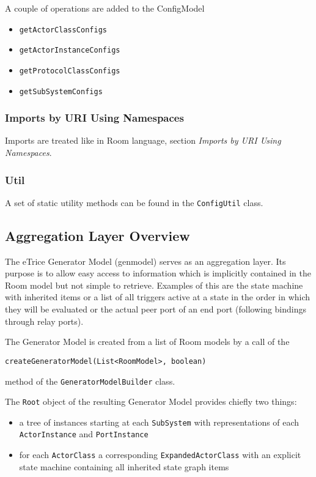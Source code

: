 A couple of operations are added to the ConfigModel
\begin{itemize}
\item \texttt{getActorClassConfigs}
\item \texttt{getActorInstanceConfigs}
\item \texttt{getProtocolClassConfigs}
\item \texttt{getSubSystemConfigs}
\end{itemize}

\subsubsection{Imports by URI Using Namespaces}

Imports are treated like in Room language, section \textit{Imports by URI Using Namespaces}.

\subsubsection{Util}

A set of static utility methods can be found in the \texttt{ConfigUtil} class.

\subsection{Aggregation Layer Overview}

The eTrice Generator Model (genmodel) serves as an aggregation layer. Its purpose is to allow easy access to information which is implicitly contained in the Room model but not simple to retrieve.
Examples of this are the state machine with inherited items or a list of all triggers active at a state in the order in which they will be evaluated or the actual peer port of an end port (following bindings through relay ports).

The Generator Model is created from a list of Room models by a call of the

\begin{verbatim}createGeneratorModel(List<RoomModel>, boolean)\end{verbatim}

method of the \texttt{GeneratorModelBuilder} class.

The \texttt{Root} object of the resulting Generator Model provides chiefly two things:
\begin{itemize}
\item a tree of instances starting at each \texttt{SubSystem} with representations of each \texttt{ActorInstance} and \texttt{PortInstance}
\item for each \texttt{ActorClass} a corresponding \texttt{ExpandedActorClass} with an explicit state machine containing all inherited state graph items
\end{itemize}

